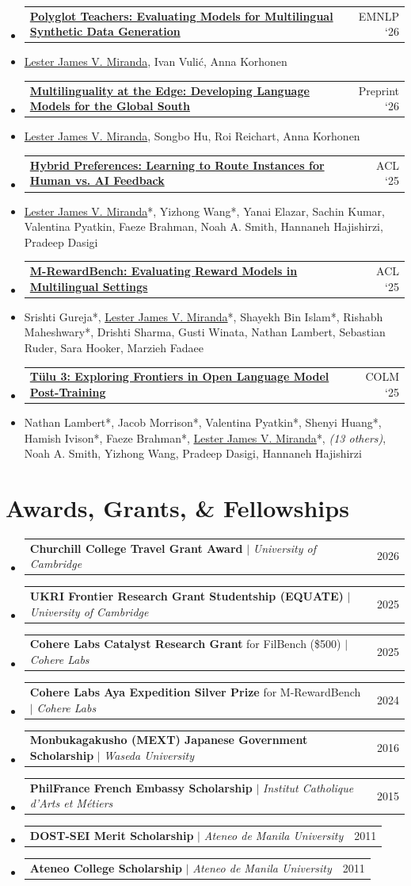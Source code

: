 \documentclass[a4paper,11pt]{article}
\makeatletter
\newcommand{\resumeItem}[1]{
  \item\small{
    {#1 \vspace{-2pt}}
  }
}
\newcommand{\resumeProjectHeading}[2]{
    \item
    \begin{tabular*}{0.97\textwidth}{l@{\extracolsep{\fill}}r}
      \small#1 & #2 \\
    \end{tabular*}\vspace{-7pt}
}
\newcommand{\resumeSubHeadingListStart}{\begin{itemize}[leftmargin=0.15in, label={}]}
\newcommand{\resumeSubHeadingListEnd}{\end{itemize}}
\makeatother
\begin{document}
\resumeSubHeadingListStart
\resumeProjectHeading
{\href{https://arxiv.org/abs/2604.11290}{\textbf{Polyglot Teachers: Evaluating Models for Multilingual Synthetic Data Generation}}}{\small EMNLP `26}
\resumeItem{\underline{Lester James V. Miranda}, Ivan Vuli\'c, Anna Korhonen}
\resumeProjectHeading
{\href{https://arxiv.org/abs/2604.21637}{\textbf{Multilinguality at the Edge: Developing Language Models for the Global South}}}{\small Preprint `26}
\resumeItem{\underline{Lester James V. Miranda}, Songbo Hu, Roi Reichart, Anna Korhonen}
\resumeProjectHeading
{\href{https://aclanthology.org/2025.acl-long.355/}{\textbf{Hybrid Preferences: Learning to Route Instances for Human vs. AI Feedback}}}{\small ACL `25}
\resumeItem{\underline{Lester James V. Miranda}*, Yizhong Wang*, Yanai Elazar, Sachin Kumar, Valentina Pyatkin, Faeze Brahman, Noah A. Smith, Hannaneh Hajishirzi, Pradeep Dasigi}
\resumeProjectHeading
{\href{https://aclanthology.org/2025.acl-long.3/}{\textbf{M-RewardBench: Evaluating Reward Models in Multilingual Settings}}}{\small ACL `25}
\resumeItem{Srishti Gureja*, \underline{Lester James V. Miranda}*, Shayekh Bin Islam*, Rishabh Maheshwary*, Drishti Sharma, Gusti Winata, Nathan Lambert, Sebastian Ruder, Sara Hooker, Marzieh Fadaee}
\resumeProjectHeading
{\href{https://openreview.net/forum?id=i1uGbfHHpH\#discussion}{\textbf{T\"ulu 3: Exploring Frontiers in Open Language Model Post-Training}}}{\small COLM `25}
\resumeItem{Nathan Lambert*, Jacob Morrison*, Valentina Pyatkin*, Shenyi Huang*, Hamish Ivison*, Faeze Brahman*, \underline{Lester James V. Miranda}*, \textit{(13 others)}, Noah A. Smith, Yizhong Wang, Pradeep Dasigi, Hannaneh Hajishirzi}
\resumeSubHeadingListEnd

\section{Awards, Grants, \& Fellowships}
\resumeSubHeadingListStart
\resumeProjectHeading
{\textbf{Churchill College Travel Grant Award} $|$ \emph{University of Cambridge}}{2026}
\resumeProjectHeading
{\textbf{UKRI Frontier Research Grant Studentship (EQUATE)} $|$ \emph{University of Cambridge}}{2025}
\resumeProjectHeading
{\textbf{Cohere Labs Catalyst Research Grant} for FilBench (\$500) $|$ \emph{Cohere Labs}}{2025}
\resumeProjectHeading
{\textbf{Cohere Labs Aya Expedition Silver Prize} for M-RewardBench $|$ \emph{Cohere Labs}}{2024}
\resumeProjectHeading
{\textbf{Monbukagakusho (MEXT) Japanese Government Scholarship} $|$ \emph{Waseda University}}{2016}
\resumeProjectHeading
{\textbf{PhilFrance French Embassy Scholarship} $|$ \emph{Institut Catholique d'Arts et Métiers}}{2015}
\resumeProjectHeading
{\textbf{DOST-SEI Merit Scholarship} $|$ \emph{Ateneo de Manila University}}{2011}
\resumeProjectHeading
{\textbf{Ateneo College Scholarship} $|$ \emph{Ateneo de Manila University}}{2011}
\resumeSubHeadingListEnd
\end{document}
